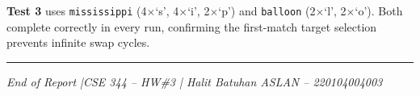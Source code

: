 \documentclass[12pt,a4paper]{article}
\begin{document}
\textbf{Test 3} uses \texttt{mississippi} (4$\times$`s', 4$\times$`i', 2$\times$`p') and
\texttt{balloon} (2$\times$`l', 2$\times$`o'). Both complete correctly in every run,
confirming the first-match target selection prevents infinite swap cycles.

\vspace{1.5cm}
\noindent\rule{\textwidth}{0.8pt}
\begin{center}
\small\textit{End of Report \quad|\quad CSE 344 -- HW\#3 \quad|\quad
Halit Batuhan ASLAN -- 220104004003}
\end{center}
\end{document}
